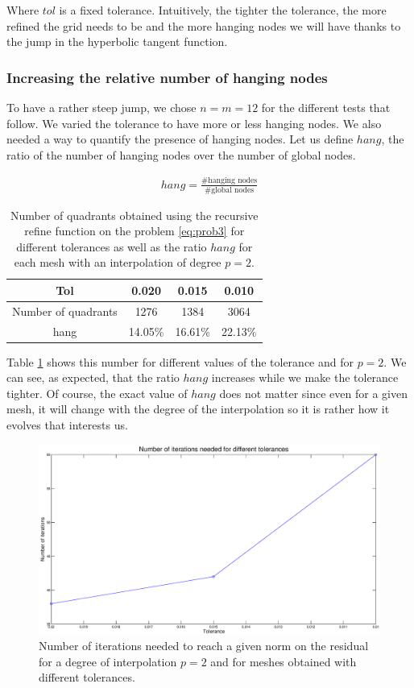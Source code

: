 Where $tol$ is a fixed tolerance. Intuitively, the tighter the tolerance, the more refined the grid needs to be and the more hanging nodes we will have thanks to the jump in the hyperbolic tangent function. 

\subsubsection{Increasing the relative number of hanging nodes}

To have a rather steep jump, we chose $n=m=12$ for the different tests that follow. We varied the tolerance to have more or less hanging nodes. We also needed a way to quantify the presence of hanging nodes. Let us define $hang$, the ratio of the number of hanging nodes over the number of global nodes. 

\begin{align}
 hang = \frac{\#\text{hanging nodes}}{\#\text{global nodes}}
 \label{hang_frac}
 \end{align}

\begin{table}
\centering
\begin{tabular}{c|ccc}
\hline
Tol & 0.020 & 0.015 & 0.010\\
\hline
Number of quadrants &1276 & 1384 & 3064 \\
\hline
hang & 14.05\% & 16.61\% & 22.13\%\\
\hline
\end{tabular}
\caption{Number of quadrants obtained using the recursive refine function on the problem \ref{eq:prob3} for different tolerances as well as the ratio $hang$ for each mesh with an interpolation of degree $p=2$.}
\label{fine_hanging_ratio}
\end{table}

Table \ref{fine_hanging_ratio} shows this number for different values of the tolerance and for $p=2$. We can see, as expected, that the ratio $hang$ increases while we make the tolerance tighter. Of course, the exact value of $hang$ does not matter since even for a given mesh, it will change with the degree of the interpolation so it is rather how it evolves that interests us. 

\begin{figure}
\centering
\includegraphics[scale=0.35]{Results/fine_hang_plot.eps}
\caption{Number of iterations needed to reach a given norm on the residual for a degree of interpolation $p=2$ and for meshes obtained with different tolerances.}
\label{fine_hang_plot}
\end{figure}


